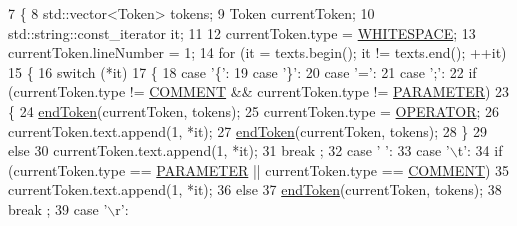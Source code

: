 \begin{DoxyCode}
7     \{
8         std::vector<Token>      tokens;
9         Token               currentToken;
10         std::string::const\_iterator it;
11         
12         currentToken.type = \hyperlink{namespaceft_aa520fbf142ba1e7e659590c07da31921aba113c37f25d24aada154b75c7dd91ba}{WHITESPACE};
13         currentToken.lineNumber = 1;
14         \textcolor{keywordflow}{for} (it = texts.begin(); it != texts.end(); ++it)
15         \{
16             \textcolor{keywordflow}{switch} (*it)
17             \{
18                 \textcolor{keywordflow}{case} \textcolor{charliteral}{'\{'}:
19                 \textcolor{keywordflow}{case} \textcolor{charliteral}{'\}'}:
20                 \textcolor{keywordflow}{case} \textcolor{charliteral}{'='}:
21                 \textcolor{keywordflow}{case} \textcolor{charliteral}{';'}:
22                     \textcolor{keywordflow}{if} (currentToken.type != \hyperlink{namespaceft_aa520fbf142ba1e7e659590c07da31921aae696377c19e507b64e16be78ce3bbdb}{COMMENT} && currentToken.type != 
      \hyperlink{namespaceft_aa520fbf142ba1e7e659590c07da31921a194cde856bd2d79eac8adb9741c55940}{PARAMETER})
23                     \{
24                         \hyperlink{classft_1_1_tokenizer_a4d9a98ce2e5ef728cfa5a68c8f726587}{endToken}(currentToken, tokens);
25                         currentToken.type = \hyperlink{namespaceft_aa520fbf142ba1e7e659590c07da31921a6411d9d6073252e4d316493506bbb979}{OPERATOR};
26                         currentToken.text.append(1, *it);
27                         \hyperlink{classft_1_1_tokenizer_a4d9a98ce2e5ef728cfa5a68c8f726587}{endToken}(currentToken, tokens);
28                     \}
29                     \textcolor{keywordflow}{else}
30                         currentToken.text.append(1, *it);
31                     break ;
32                 \textcolor{keywordflow}{case} \textcolor{charliteral}{' '}:
33                 \textcolor{keywordflow}{case} \textcolor{charliteral}{'\(\backslash\)t'}:
34                     \textcolor{keywordflow}{if} (currentToken.type == \hyperlink{namespaceft_aa520fbf142ba1e7e659590c07da31921a194cde856bd2d79eac8adb9741c55940}{PARAMETER} || currentToken.type == 
      \hyperlink{namespaceft_aa520fbf142ba1e7e659590c07da31921aae696377c19e507b64e16be78ce3bbdb}{COMMENT})
35                         currentToken.text.append(1, *it);
36                     \textcolor{keywordflow}{else}
37                         \hyperlink{classft_1_1_tokenizer_a4d9a98ce2e5ef728cfa5a68c8f726587}{endToken}(currentToken, tokens);
38                     break ;
39                 \textcolor{keywordflow}{case} \textcolor{charliteral}{'\(\backslash\)r'}:

\end{DoxyCode}
